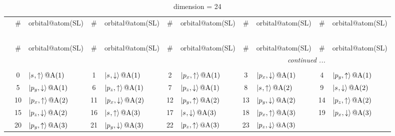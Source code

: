 \documentclass[fleqn,10pt,landscape]{jsarticle}
\begin{document}
\renewcommand{\arraystretch}{1.6}
\begin{longtable}[l]{c|cl|cl|cl|cl|cl}
\captionsetup{justification=raggedright, singlelinecheck=off}
\caption{dimension = 24}
 \\
 \hline \hline
 & \# & orbital@atom(SL) & \# & orbital@atom(SL) & \# & orbital@atom(SL) & \# & orbital@atom(SL) & \# & orbital@atom(SL) \\ \hline \endfirsthead

\multicolumn{10}{l}{\tablename\ \thetable{}} \\
 \hline \hline
 & \# & orbital@atom(SL) & \# & orbital@atom(SL) & \# & orbital@atom(SL) & \# & orbital@atom(SL) & \# & orbital@atom(SL) \\ \hline \endhead

 \hline \hline
\multicolumn{10}{r}{\footnotesize\it continued ...} \\ \endfoot

 \hline \hline
\multicolumn{10}{r}{} \\ \endlastfoot

 & 0 & $\ket{s_{},\uparrow}@{\rm A}(1)$ & 1 & $\ket{s_{},\downarrow}@{\rm A}(1)$ & 2 & $\ket{p_{x},\uparrow}@{\rm A}(1)$ & 3 & $\ket{p_{x},\downarrow}@{\rm A}(1)$ & 4 & $\ket{p_{y},\uparrow}@{\rm A}(1)$ \\
& 5 & $\ket{p_{y},\downarrow}@{\rm A}(1)$ & 6 & $\ket{p_{z},\uparrow}@{\rm A}(1)$ & 7 & $\ket{p_{z},\downarrow}@{\rm A}(1)$ & 8 & $\ket{s_{},\uparrow}@{\rm A}(2)$ & 9 & $\ket{s_{},\downarrow}@{\rm A}(2)$ \\
& 10 & $\ket{p_{x},\uparrow}@{\rm A}(2)$ & 11 & $\ket{p_{x},\downarrow}@{\rm A}(2)$ & 12 & $\ket{p_{y},\uparrow}@{\rm A}(2)$ & 13 & $\ket{p_{y},\downarrow}@{\rm A}(2)$ & 14 & $\ket{p_{z},\uparrow}@{\rm A}(2)$ \\
& 15 & $\ket{p_{z},\downarrow}@{\rm A}(2)$ & 16 & $\ket{s_{},\uparrow}@{\rm A}(3)$ & 17 & $\ket{s_{},\downarrow}@{\rm A}(3)$ & 18 & $\ket{p_{x},\uparrow}@{\rm A}(3)$ & 19 & $\ket{p_{x},\downarrow}@{\rm A}(3)$ \\
& 20 & $\ket{p_{y},\uparrow}@{\rm A}(3)$ & 21 & $\ket{p_{y},\downarrow}@{\rm A}(3)$ & 22 & $\ket{p_{z},\uparrow}@{\rm A}(3)$ & 23 & $\ket{p_{z},\downarrow}@{\rm A}(3)$ &  &  \\
\end{longtable}
\renewcommand{\arraystretch}{1.6}
\end{document}
